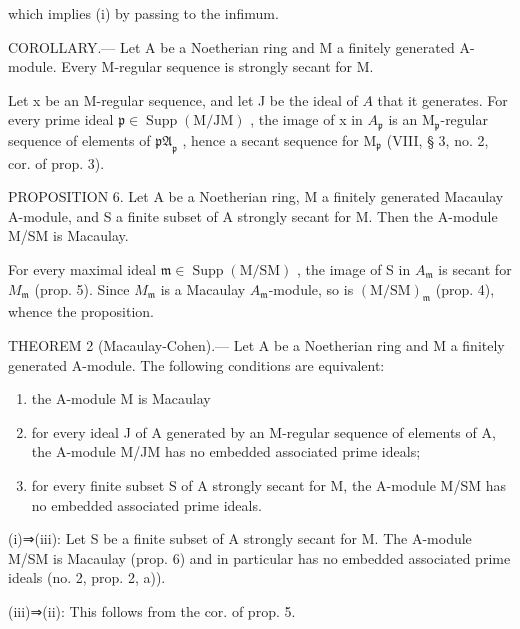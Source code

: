 which implies (i) by passing to the infimum.

COROLLARY.--- Let A be a Noetherian ring and M a finitely generated A-module. Every M-regular sequence is strongly secant for M.

Let x be an M-regular sequence, and let J be the ideal of \(A\) that it generates. For every prime ideal \(\mathfrak{p} \in \operatorname{Supp}(\mathrm{M/JM})\) , the image of x in \(A_{\mathfrak{p}}\) is an \(\mathrm{M}_{\mathfrak{p}}\)-regular sequence of elements of \(\mathfrak{pA}_{\mathfrak{p}}\) , hence a secant sequence for \(\mathrm{M}_{\mathfrak{p}}\) (VIII, § 3, no. 2, cor. of prop. 3).

PROPOSITION 6. Let A be a Noetherian ring, M a finitely generated Macaulay A-module, and S a finite subset of A strongly secant for M. Then the A-module M/SM is Macaulay.

For every maximal ideal \(\mathfrak{m} \in \operatorname{Supp}(\mathrm{M} / \mathrm{SM})\) , the image of S in \(A_{\mathfrak{m}}\) is secant for \(M_{\mathfrak{m}}\) (prop. 5). Since \(M_{\mathfrak{m}}\) is a Macaulay \(A_{\mathfrak{m}}\)-module, so is \((\mathrm{M} / \mathrm{SM})_{\mathfrak{m}}\) (prop. 4), whence the proposition.

THEOREM 2 (Macaulay-Cohen).--- Let A be a Noetherian ring and M a finitely generated A-module. The following conditions are equivalent:

\begin{enumerate}
\def\labelenumi{(\roman{enumi})}
\item
  the A-module M is Macaulay
\item
  for every ideal J of A generated by an M-regular sequence of elements of A, the A-module M/JM has no embedded associated prime ideals;
\item
  for every finite subset S of A strongly secant for M, the A-module M/SM has no embedded associated prime ideals.
\end{enumerate}

(i)⇒(iii): Let S be a finite subset of A strongly secant for M. The A-module M/SM is Macaulay (prop. 6) and in particular has no embedded associated prime ideals (no. 2, prop. 2, a)).

(iii)⇒(ii): This follows from the cor. of prop. 5.

